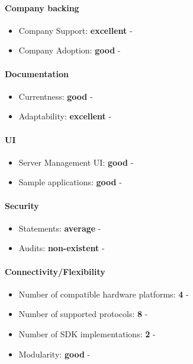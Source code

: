 \documentclass{article}
\begin{document}
\paragraph{Company backing}

\begin{itemize}
\item Company Support: \textbf{excellent} - 
\item Company Adoption: \textbf{good} - 
\end{itemize}

\paragraph{Documentation}

\begin{itemize}
\item Currentness: \textbf{good} - 
\item Adaptability: \textbf{excellent} - 
\end{itemize}

\paragraph{UI}

\begin{itemize}
\item Server Management UI: \textbf{good} - 
\item Sample applications: \textbf{good} - 
\end{itemize}

\paragraph{Security} 

\begin{itemize}
\item Statements: \textbf{average} - 
\item Audits: \textbf{non-existent} - 
\end{itemize}

\paragraph{Connectivity/Flexibility}

\begin{itemize}
\item Number of compatible hardware platforms: \textbf{4} - 
\item Number of supported protocols: \textbf{8} - 
\item Number of SDK implementations: \textbf{2} - 
\item Modularity: \textbf{good} - 
\end{itemize}
\end{document}
